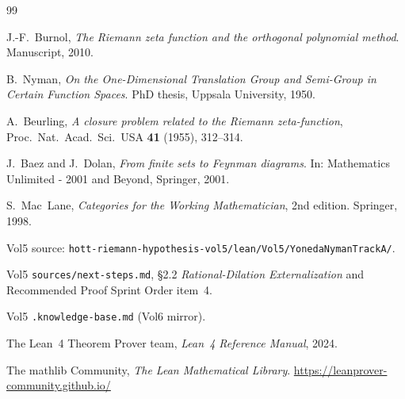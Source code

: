 \documentclass[12pt]{article}
\theoremstyle{plain}
\theoremstyle{definition}
\theoremstyle{remark}
\begin{document}
\begin{thebibliography}{99}

J.-F.\ Burnol,
\emph{The Riemann zeta function and the orthogonal polynomial method}.
Manuscript, 2010.

B.\ Nyman,
\emph{On the One-Dimensional Translation Group and Semi-Group in Certain
Function Spaces}.
PhD thesis, Uppsala University, 1950.

A.\ Beurling,
\emph{A closure problem related to the Riemann zeta-function},
Proc.\ Nat.\ Acad.\ Sci.\ USA \textbf{41} (1955), 312--314.

J.\ Baez and J.\ Dolan,
\emph{From finite sets to Feynman diagrams}.
In: Mathematics Unlimited - 2001 and Beyond, Springer, 2001.

S.\ Mac~Lane,
\emph{Categories for the Working Mathematician}, 2nd edition.
Springer, 1998.

Vol5 source: \texttt{hott-riemann-hypothesis-vol5/lean/Vol5/YonedaNymanTrackA/}.

Vol5 \texttt{sources/next-steps.md},
\S2.2 \emph{Rational-Dilation Externalization} and Recommended Proof
Sprint Order item~4.

Vol5 \texttt{.knowledge-base.md} (Vol6 mirror).

The Lean~4 Theorem Prover team,
\emph{Lean~4 Reference Manual}, 2024.

The mathlib Community,
\emph{The Lean Mathematical Library}.
\url{https://leanprover-community.github.io/}

\end{thebibliography}
\end{document}
